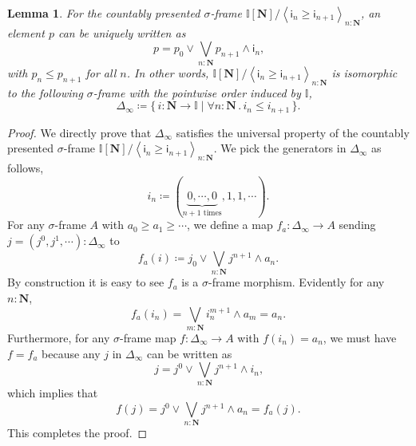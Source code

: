 \documentclass[a4paper,12pt]{amsart}
\newtheorem{lemma}[theorem]{Lemma}
\theoremstyle{definition}
\newcommand{\mb}[1]{\mathbf{#1}}
\newcommand{\mbb}[1]{\mathbb{#1}}
\newcommand{\I}{\mbb I}
\newcommand{\ms}[1]{\mathsf{#1}}
\newcommand{\pair}[1]{\left\langle#1\right\rangle}
\newcommand{\scomp}[2]{\{\,#1\mid#2\,\}}
\newcommand{\N}{\mb N}
\newcommand{\fa}[2]{\forall #1\!\colon\!\!#2\mathpunct{.}}
\begin{document}
\begin{lemma}\label{app:normalsigma}
  For the countably presented $\sigma$-frame $\I[\N]/\pair{\ms{i}_n \ge \ms{i}_{n+1}}_{n:\N}$, an element $p$ can be uniquely written as 
  \[ p = p_0 \vee \bigvee_{n:\N} p_{n+1} \wedge \ms{i}_n\text{,} \]
  with $p_n \le p_{n+1}$ for all $n$. In other words, $\I[\N]/\pair{\ms{i}_n \ge \ms{i}_{n+1}}_{n:\N}$ is isomorphic to the following $\sigma$-frame with the pointwise order induced by $\I$,
  \[ \Delta_\infty \coloneq \scomp{i : \N \to \I}{\fa n\N i_n \le i_{n+1}}\text{.} \]
\end{lemma}
\begin{proof}
  We directly prove that $\Delta_\infty$ satisfies the universal property of the countably presented $\sigma$-frame $\I[\N]/\pair{\ms{i}_n \ge \ms{i}_{n+1}}_{n:\N}$. We pick the generators in $\Delta_\infty$ as follows,
  \[ i_n \coloneq (\underbrace{0,\cdots,0}_{n+1 \text{ times}},1,1,\cdots)\text{.} \]
  For any $\sigma$-frame $A$ with $a_0 \ge a_1 \ge \cdots$, we define a map $f_a : \Delta_\infty \to A$ sending $j = (j^0,j^1,\cdots) : \Delta_\infty$ to
  \[ f_a(i) \coloneq j_0 \vee \bigvee_{n:\N} j^{n+1} \wedge a_{n}\text{.} \]
  By construction it is easy to see $f_a$ is a $\sigma$-frame morphism. Evidently for any $n : \N$, 
  \[ f_a(i_n) = \bigvee_{m:\N} i_n^{m+1} \wedge a_m = a_n\text{.} \]
  Furthermore, for any $\sigma$-frame map $f \colon \Delta_\infty \to A$ with $f(i_n) = a_n$, we must have $f = f_a$ because any $j$ in $\Delta_\infty$ can be written as
  \[ j = j^0 \vee \bigvee_{n:\N} j^{n+1} \wedge i_n\text{,} \]
  which implies that
  \[ f(j) = j^0 \vee \bigvee_{n:\N}j^{n+1} \wedge a_n = f_a(j)\text{.} \]
  This completes the proof.
\end{proof}

\end{document}

